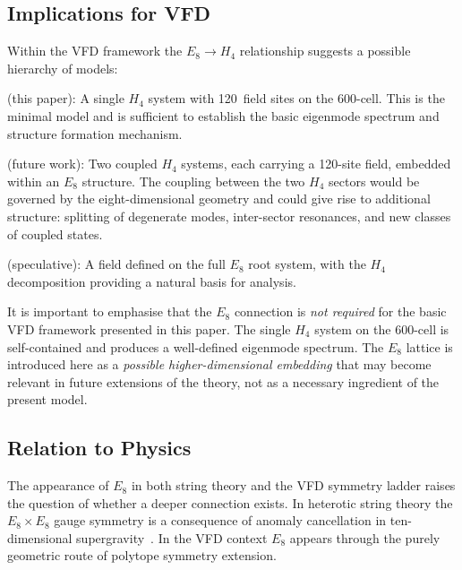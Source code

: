 \documentclass[12pt,a4paper]{article}
\newcommand{\Hfour}{H_4}
\newcommand{\Eeight}{E_8}
\begin{document}
\subsection{Implications for VFD}

Within the VFD framework the $\Eeight \to \Hfour$ relationship suggests a
possible hierarchy of models:

\begin{description}[nosep, leftmargin=1.5cm, style=nextline]
  \item[Level 1] (this paper):\;
    A single $\Hfour$ system with 120~field sites on the 600-cell.  This is
    the minimal model and is sufficient to establish the basic eigenmode
    spectrum and structure formation mechanism.

  \item[Level 2] (future work):\;
    Two coupled $\Hfour$ systems, each carrying a 120-site field, embedded
    within an $\Eeight$ structure.  The coupling between the two $\Hfour$
    sectors would be governed by the eight-dimensional geometry and could give
    rise to additional structure: splitting of degenerate modes, inter-sector
    resonances, and new classes of coupled states.

  \item[Level 3] (speculative):\;
    A field defined on the full $\Eeight$ root system, with the $\Hfour$
    decomposition providing a natural basis for analysis.
\end{description}

It is important to emphasise that the $\Eeight$ connection is \emph{not
required} for the basic VFD framework presented in this paper.  The single
$\Hfour$ system on the 600-cell is self-contained and produces a well-defined
eigenmode spectrum.  The $\Eeight$ lattice is introduced here as a
\emph{possible higher-dimensional embedding} that may become relevant in future
extensions of the theory, not as a necessary ingredient of the present model.

\subsection{Relation to Physics}

The appearance of $\Eeight$ in both string theory and the VFD symmetry ladder
raises the question of whether a deeper connection exists.  In heterotic string
theory the $\Eeight \times \Eeight$ gauge symmetry is a consequence of anomaly
cancellation in ten-dimensional supergravity~\cite{gross1985}.  In the VFD
context $\Eeight$ appears through the purely geometric route of polytope
symmetry extension.
\end{document}
